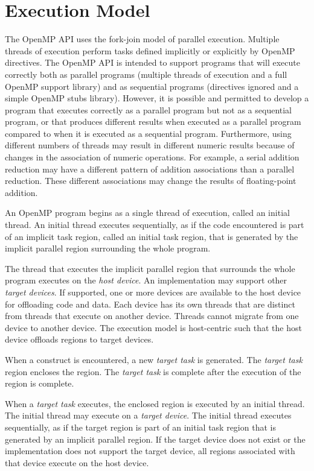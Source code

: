 \section{Execution Model}
\label{sec:Execution Model}
The OpenMP API uses the fork-join model of parallel execution. Multiple threads of
execution perform tasks defined implicitly or explicitly by OpenMP directives. The
OpenMP API is intended to support programs that will execute correctly both as parallel
programs (multiple threads of execution and a full OpenMP support library) and as
sequential programs (directives ignored and a simple OpenMP stubs library). However,
it is possible and permitted to develop a program that executes correctly as a parallel
program but not as a sequential program, or that produces different results when
executed as a parallel program compared to when it is executed as a sequential program.
Furthermore, using different numbers of threads may result in different numeric results
because of changes in the association of numeric operations. For example, a serial
addition reduction may have a different pattern of addition associations than a parallel
reduction. These different associations may change the results of floating-point addition.

An OpenMP program begins as a single thread of execution, called an initial thread. An
initial thread executes sequentially, as if the code encountered is part of an implicit task region, called an
initial task region, that is generated by the implicit parallel region surrounding the whole
program.

The thread that executes the implicit parallel region that surrounds the whole program
executes on the \emph{host device}. An implementation may support
other \emph{target devices}. If
supported, one or more devices are available to the host device for offloading code and
data. Each device has its own threads that are distinct from threads that execute on
another device. Threads cannot migrate from one device to another device. The
execution model is host-centric such that the host device offloads  regions to
target devices.

When a  construct is encountered, a new \emph{target task} is generated.
The \emph{target task} region encloses the  region. The \emph{target task} is
complete after the execution of the  region is complete.

When a \emph{target task} executes, the enclosed  region is executed by an initial
thread.  The initial thread may execute on a \emph{target device}.  The initial thread executes
sequentially, as if the target region is part of an initial task region that is
generated by an implicit parallel region. If the target device does not exist or the implementation does not support the target
device, all  regions associated with that device execute on the host device.

